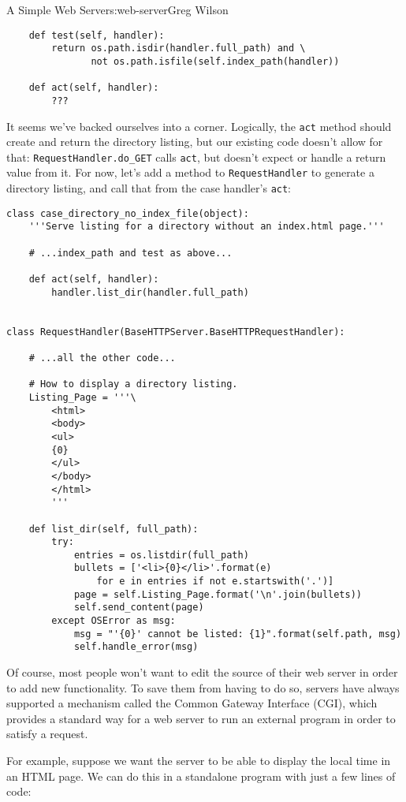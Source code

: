 \begin{aosachapter}{A Simple Web Server}{s:web-server}{Greg Wilson}
\begin{verbatim}
    def test(self, handler):
        return os.path.isdir(handler.full_path) and \
               not os.path.isfile(self.index_path(handler))

    def act(self, handler):
        ???
\end{verbatim}

It seems we've backed ourselves into a corner. Logically, the
\texttt{act} method should create and return the directory listing, but
our existing code doesn't allow for that:
\texttt{RequestHandler.do\_GET} calls \texttt{act}, but doesn't expect
or handle a return value from it. For now, let's add a method to
\texttt{RequestHandler} to generate a directory listing, and call that
from the case handler's \texttt{act}:

\begin{verbatim}
class case_directory_no_index_file(object):
    '''Serve listing for a directory without an index.html page.'''

    # ...index_path and test as above...

    def act(self, handler):
        handler.list_dir(handler.full_path)


class RequestHandler(BaseHTTPServer.BaseHTTPRequestHandler):

    # ...all the other code...

    # How to display a directory listing.
    Listing_Page = '''\
        <html>
        <body>
        <ul>
        {0}
        </ul>
        </body>
        </html>
        '''

    def list_dir(self, full_path):
        try:
            entries = os.listdir(full_path)
            bullets = ['<li>{0}</li>'.format(e) 
                for e in entries if not e.startswith('.')]
            page = self.Listing_Page.format('\n'.join(bullets))
            self.send_content(page)
        except OSError as msg:
            msg = "'{0}' cannot be listed: {1}".format(self.path, msg)
            self.handle_error(msg)
\end{verbatim}

\label{the-cgi-protocol}

Of course, most people won't want to edit the source of their web server
in order to add new functionality. To save them from having to do so,
servers have always supported a mechanism called the Common Gateway
Interface (CGI), which provides a standard way for a web server to run
an external program in order to satisfy a request.

For example, suppose we want the server to be able to display the local
time in an HTML page. We can do this in a standalone program with just a
few lines of code:


\end{aosachapter}
